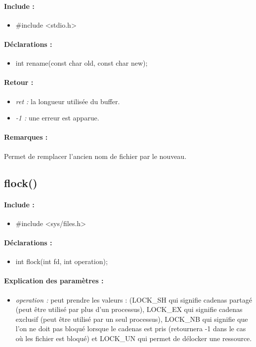 \documentclass{article}[12pt]
\begin{document}
\paragraph{Include : }
\begin{itemize}
	\item \#include <stdio.h>
\end{itemize}
\paragraph{Déclarations : }
\begin{itemize}
	\item int rename(const char \* old, const char \* new);
\end{itemize}
\paragraph{Retour : }
\begin{itemize}
	\item \emph{ret : } la longueur utilisée du buffer. 
	\item \emph{-1 : } une erreur est apparue.
\end{itemize}
\paragraph{Remarques : }
Permet de remplacer l'ancien nom de fichier par le nouveau.
\subsection{flock()}
\paragraph{Include : }
\begin{itemize}
	\item \#include <sys/files.h>
\end{itemize}
\paragraph{Déclarations : }
\begin{itemize}
	\item int flock(int fd, int operation);
\end{itemize}
\paragraph{Explication des paramètres : }
\begin{itemize}
	\item \emph{operation : } peut prendre les valeurs : (LOCK\_SH qui signifie cadenas partagé (peut être utilisé par plus d'un processus), LOCK\_EX qui signifie cadenas exclusif (peut être utilisé par un seul processus), LOCK\_NB qui signifie que l'on ne doit pas bloqué lorsque le cadenas est pris (retournera -1 dans le cas où les fichier est bloqué) et LOCK\_UN qui permet de délocker une ressource. 
\end{itemize}
\end{document}
